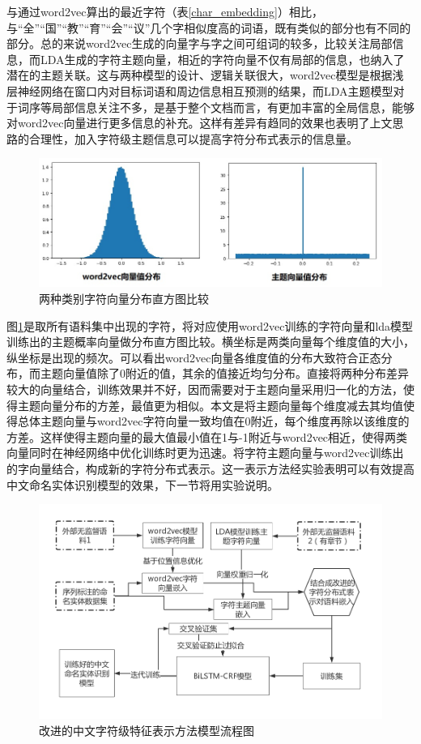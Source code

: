 \documentclass[winfonts,master,oneside,nobackinfo]{njuthesis}
\begin{document}
与通过word2vec算出的最近字符（表\ref{char_embedding}）相比，与“全”“国”“教”“育”“会”“议”几个字相似度高的词语，既有类似的部分也有不同的部分。总的来说word2vec生成的向量字与字之间可组词的较多，比较关注局部信息，而LDA生成的字符主题向量，相近的字符向量不仅有局部的信息，也纳入了潜在的主题关联。这与两种模型的设计、逻辑关联很大，word2vec模型是根据浅层神经网络在窗口内对目标词语和周边信息相互预测的结果，而LDA主题模型对于词序等局部信息关注不多，是基于整个文档而言，有更加丰富的全局信息，能够对word2vec向量进行更多信息的补充。这样有差异有趋同的效果也表明了上文思路的合理性，加入字符级主题信息可以提高字符分布式表示的信息量。

\begin{figure}[H]
\centering
\includegraphics[width=1\textwidth]{./figure/分布.jpg}
\caption{两种类别字符向量分布直方图比较}
\label{two-distribution}
\end{figure}

图\ref{two-distribution}是取所有语料集中出现的字符，将对应使用word2vec训练的字符向量和lda模型训练出的主题概率向量做分布直方图比较。横坐标是两类向量每个维度值的大小，纵坐标是出现的频次。可以看出word2vec向量各维度值的分布大致符合正态分布，而主题向量值除了0附近的值，其余的值接近均匀分布。直接将两种分布差异较大的向量结合，训练效果并不好，因而需要对于主题向量采用归一化的方法，使得主题向量分布的方差，最值更为相似。本文是将主题向量每个维度减去其均值使得总体主题向量与word2vec字符向量一致均值在0附近，每个维度再除以该维度的方差。这样使得主题向量的最大值最小值在1与-1附近与word2vec相近，使得两类向量同时在神经网络中优化训练时更为迅速。将字符主题向量与word2vec训练出的字向量结合，构成新的字符分布式表示。这一表示方法经实验表明可以有效提高中文命名实体识别模型的效果，下一节将用实验说明。

\begin{figure}[h]
\centering
\includegraphics[width=1\textwidth]{./figure/改进的字符分布式表示.jpg}
\caption{改进的中文字符级特征表示方法模型流程图}
\label{all-step}
\end{figure}
\end{document}
